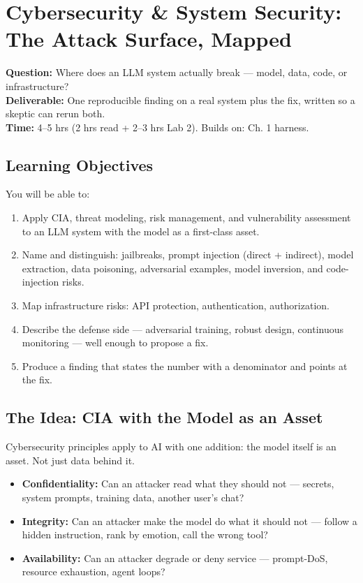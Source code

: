 \chapter{Cybersecurity \& System Security: The Attack Surface, Mapped}
\label{ch:2}

\begin{tcolorbox}[colback=white,colframe=checkblack,title=Chapter 2 at a Glance,fonttitle=\bfseries,sharp corners,boxrule=1pt]
\textbf{Question:} Where does an LLM system actually break — model, data, code, or infrastructure?\\
\textbf{Deliverable:} One reproducible finding on a real system plus the fix, written so a skeptic can rerun both.\\
\textbf{Time:} 4–5 hrs (2 hrs read + 2–3 hrs Lab 2). Builds on: Ch. 1 harness.
\end{tcolorbox}

\section{Learning Objectives}
\fbadge
You will be able to:
\begin{enumerate}
\item Apply CIA, threat modeling, risk management, and vulnerability assessment to an LLM system with the model as a first-class asset.
\item Name and distinguish: jailbreaks, prompt injection (direct + indirect), model extraction, data poisoning, adversarial examples, model inversion, and code-injection risks.
\item Map infrastructure risks: API protection, authentication, authorization.
\item Describe the defense side — adversarial training, robust design, continuous monitoring — well enough to propose a fix.
\item Produce a finding that states the number with a denominator and points at the fix.
\end{enumerate}

\section{The Idea: CIA with the Model as an Asset}
\tierF

Cybersecurity principles apply to AI with one addition: the model itself is an asset. Not just data behind it.

\begin{itemize}
\item \textbf{Confidentiality:} Can an attacker read what they should not — secrets, system prompts, training data, another user's chat?
\item \textbf{Integrity:} Can an attacker make the model do what it should not — follow a hidden instruction, rank by emotion, call the wrong tool?
\item \textbf{Availability:} Can an attacker degrade or deny service — prompt-DoS, resource exhaustion, agent loops?
\end{itemize}


